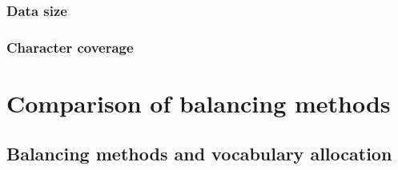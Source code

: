 \subsubsection{Data size}



\subsubsection{Character coverage}



\section{Comparison of balancing methods}
\subsection{Balancing methods and vocabulary allocation}



